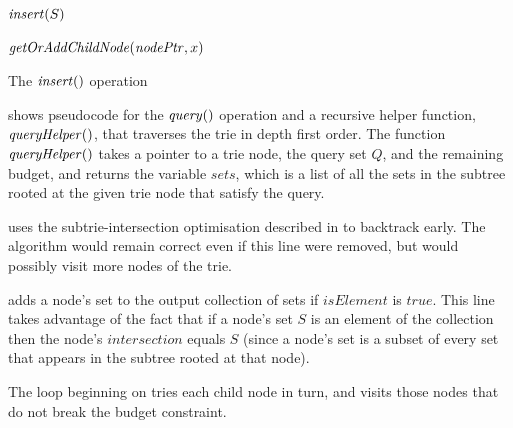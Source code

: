 {
\begin{algorithm}[htb]
 \footnotesize
\DontPrintSemicolon

\nl $\mathit{insert}(S)$ \label{insertfunction} \;
\nl {}

\nl $\mathit{getOrAddChildNode}(\mathit{nodePtr}, x)$ \;
\nl {}
\caption{The $\mathit{insert}()$ operation}
\label{InsertAlgorithm}
\end{algorithm}
}

 shows pseudocode for the $\mathit{query}()$ operation and a
recursive helper function, $\mathit{queryHelper}()$, that traverses the trie in depth
first order.  The function $\mathit{queryHelper}()$ takes a pointer to a trie node, the
query set $Q$, and the remaining budget, and returns the variable
$\mathit{sets}$, which is a list of all the sets in the subtree rooted at the
given trie node that satisfy the query.

 uses the subtrie-intersection optimisation
described in  to backtrack early.  The algorithm
would remain correct even if this line were removed, but would possibly visit
more nodes of the trie.

 adds a node's set to the output collection of sets if
$\mathit{isElement}$ is $\mathit{true}$.  This line takes advantage of the
fact that if a node's set $S$ is an element of the collection
then the node's $\mathit{intersection}$ equals $S$ (since a node's set
is a subset of every set that appears in the subtree rooted at that node).

The loop beginning on  tries each child node in turn,
and visits those nodes that do not break the budget constraint.

